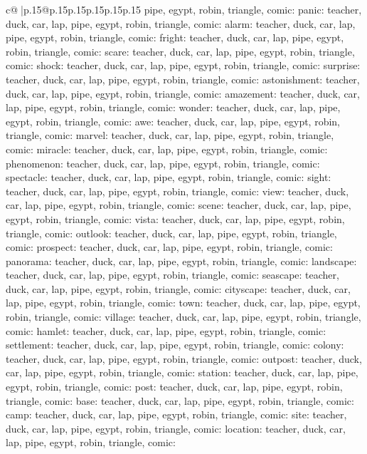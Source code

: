\documentclass{article}
\begin{document}
{\begin{supertabular}{c@{$\;$}|p{.15\linewidth}@{}p{.15\linewidth}p{.15\linewidth}p{.15\linewidth}p{.15\linewidth}p{.15\linewidth}}
{{{pipe, egypt, robin, triangle, comic\n\nCLUE: panic\nTARGETS: teacher, duck, car, lap, pipe, egypt, robin, triangle, comic\n\nCLUE: alarm\nTARGETS: teacher, duck, car, lap, pipe, egypt, robin, triangle, comic\n\nCLUE: fright\nTARGETS: teacher, duck, car, lap, pipe, egypt, robin, triangle, comic\n\nCLUE: scare\nTARGETS: teacher, duck, car, lap, pipe, egypt, robin, triangle, comic\n\nCLUE: shock\nTARGETS: teacher, duck, car, lap, pipe, egypt, robin, triangle, comic\n\nCLUE: surprise\nTARGETS: teacher, duck, car, lap, pipe, egypt, robin, triangle, comic\n\nCLUE: astonishment\nTARGETS: teacher, duck, car, lap, pipe, egypt, robin, triangle, comic\n\nCLUE: amazement\nTARGETS: teacher, duck, car, lap, pipe, egypt, robin, triangle, comic\n\nCLUE: wonder\nTARGETS: teacher, duck, car, lap, pipe, egypt, robin, triangle, comic\n\nCLUE: awe\nTARGETS: teacher, duck, car, lap, pipe, egypt, robin, triangle, comic\n\nCLUE: marvel\nTARGETS: teacher, duck, car, lap, pipe, egypt, robin, triangle, comic\n\nCLUE: miracle\nTARGETS: teacher, duck, car, lap, pipe, egypt, robin, triangle, comic\n\nCLUE: phenomenon\nTARGETS: teacher, duck, car, lap, pipe, egypt, robin, triangle, comic\n\nCLUE: spectacle\nTARGETS: teacher, duck, car, lap, pipe, egypt, robin, triangle, comic\n\nCLUE: sight\nTARGETS: teacher, duck, car, lap, pipe, egypt, robin, triangle, comic\n\nCLUE: view\nTARGETS: teacher, duck, car, lap, pipe, egypt, robin, triangle, comic\n\nCLUE: scene\nTARGETS: teacher, duck, car, lap, pipe, egypt, robin, triangle, comic\n\nCLUE: vista\nTARGETS: teacher, duck, car, lap, pipe, egypt, robin, triangle, comic\n\nCLUE: outlook\nTARGETS: teacher, duck, car, lap, pipe, egypt, robin, triangle, comic\n\nCLUE: prospect\nTARGETS: teacher, duck, car, lap, pipe, egypt, robin, triangle, comic\n\nCLUE: panorama\nTARGETS: teacher, duck, car, lap, pipe, egypt, robin, triangle, comic\n\nCLUE: landscape\nTARGETS: teacher, duck, car, lap, pipe, egypt, robin, triangle, comic\n\nCLUE: seascape\nTARGETS: teacher, duck, car, lap, pipe, egypt, robin, triangle, comic\n\nCLUE: cityscape\nTARGETS: teacher, duck, car, lap, pipe, egypt, robin, triangle, comic\n\nCLUE: town\nTARGETS: teacher, duck, car, lap, pipe, egypt, robin, triangle, comic\n\nCLUE: village\nTARGETS: teacher, duck, car, lap, pipe, egypt, robin, triangle, comic\n\nCLUE: hamlet\nTARGETS: teacher, duck, car, lap, pipe, egypt, robin, triangle, comic\n\nCLUE: settlement\nTARGETS: teacher, duck, car, lap, pipe, egypt, robin, triangle, comic\n\nCLUE: colony\nTARGETS: teacher, duck, car, lap, pipe, egypt, robin, triangle, comic\n\nCLUE: outpost\nTARGETS: teacher, duck, car, lap, pipe, egypt, robin, triangle, comic\n\nCLUE: station\nTARGETS: teacher, duck, car, lap, pipe, egypt, robin, triangle, comic\n\nCLUE: post\nTARGETS: teacher, duck, car, lap, pipe, egypt, robin, triangle, comic\n\nCLUE: base\nTARGETS: teacher, duck, car, lap, pipe, egypt, robin, triangle, comic\n\nCLUE: camp\nTARGETS: teacher, duck, car, lap, pipe, egypt, robin, triangle, comic\n\nCLUE: site\nTARGETS: teacher, duck, car, lap, pipe, egypt, robin, triangle, comic\n\nCLUE: location\nTARGETS: teacher, duck, car, lap, pipe, egypt, robin, triangle, comic\n\nCLUE: }}}
\end{supertabular}}
\end{document}
